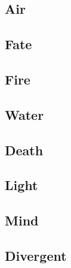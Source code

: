 \begin{multicols}{2}

\subsection{Air}


\subsection{Fate}

\subsection{Fire}

\subsection{Water}

\subsection{Death}


\subsection{Light}


\subsection{Mind}


\subsection{Divergent}


\end{multicols}
